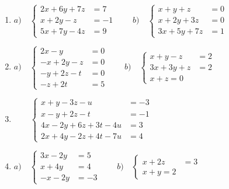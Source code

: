 \begin{enumerate}
\item $a) \quad \begin{cases}2x+6y+7z&=7\\x+2y-z&=-1\\5x+7y-4z&=9  \end{cases}\qquad b) \quad \begin{cases} x+y+z&=0\\x+2y+3z&=0\\3x+5y+7z&=1 \end{cases}$

\rightline{\textcolor{gris}{Solución: $a) \quad (10,-3,5); \; SCD; \qquad b) \quad SI$   }}

\item $a) \quad \begin{cases} 2x-y&=0\\-x+2y-z&=0\\-y+2z-t&=0\\-z+2t&=5 \end{cases} \qquad b) \quad \begin{cases} x+y-z&=2\\3x+3y+z&=2\\x+z=0\end{cases}$

\rightline{\textcolor{gris}{Solución: $a) \quad (1,2,3,4); \; SCD \qquad b) \quad (1,0,-1);\; SCD $ }}

\item $\qquad \begin{cases} x+y-3z-u&=-3\\x-y+2z-t&=-1\\4x-2y+6z+3t-4u&=3\\2x+4y-2z+4t-7u&=4 \end{cases}$


\item $a) \quad \begin{cases} 3x-2y&=5\\x+4y&=4\\-x-2y&=-3  \end{cases}\qquad b) \quad \begin{cases} x+2z&=3\\x+y=2 \end{cases}$

\rightline{\textcolor{gris}{Solución: $a)\quad (2,1/2); \; SCD \qquad b) \quad (\lambda, 2-\lambda, (3-\lambda)/2); \; SCI$  }}


\end{enumerate}
